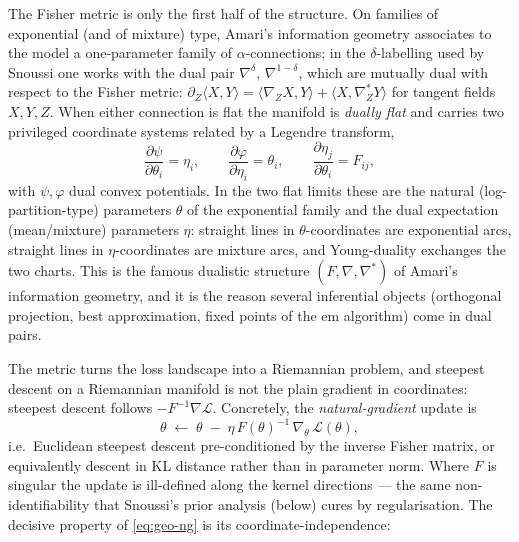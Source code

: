 The Fisher metric is only the first half of the structure. On families of
exponential (and of mixture) type, Amari's information geometry
\cite{amari1985} associates to
the model a one-parameter family of $\alpha$-connections; in the
$\delta$-labelling used by Snoussi one works with the dual pair
$\nabla^{\delta}$, $\nabla^{1-\delta}$, which are mutually dual with respect
to the Fisher metric:
$\partial_Z\langle X, Y\rangle = \langle \nabla_Z X, Y\rangle
+ \langle X, \nabla^{*}_Z Y\rangle$ for tangent fields $X, Y, Z$. When either
connection is flat the manifold is \emph{dually flat} and carries two
privileged coordinate systems related by a Legendre transform,
\begin{equation}
\frac{\partial \psi}{\partial \theta_i} = \eta_i,
\qquad
\frac{\partial \varphi}{\partial \eta_i} = \theta_i,
\qquad
\frac{\partial \eta_j}{\partial \theta_i} = F_{ij},
\label{eq:geo-legendre}
\end{equation}
with $\psi, \varphi$ dual convex potentials. In the two flat limits these are
the natural (log-partition-type) parameters $\theta$ of the exponential
family and the dual expectation (mean/mixture) parameters $\eta$: straight
lines in $\theta$-coordinates are exponential arcs, straight lines in
$\eta$-coordinates are mixture arcs, and Young-duality exchanges the two
charts. This is the famous dualistic structure $(F, \nabla, \nabla^{*})$ of
Amari's information geometry, and it is the reason several inferential
objects (orthogonal projection, best approximation, fixed points
of the em algorithm) come in dual pairs.

The metric turns the loss landscape into a Riemannian problem, and steepest
descent on a Riemannian manifold is not the plain gradient in coordinates:
steepest descent follows $-F^{-1}\nabla\mathcal{L}$. Concretely, the
\emph{natural-gradient} update is
\begin{equation}
\theta \;\leftarrow\; \theta \;-\; \eta\, F(\theta)^{-1}\, \nabla_\theta\,
\mathcal{L}(\theta),
\label{eq:geo-ng}
\end{equation}
i.e.\ Euclidean steepest descent pre-conditioned by the inverse Fisher
matrix, or equivalently descent in KL distance rather than in parameter norm.
Where $F$ is singular the update is ill-defined along the kernel
directions --- the same non-identifiability that Snoussi's prior analysis
(below) cures by regularisation. The decisive property of \eqref{eq:geo-ng} is its
coordinate-independence:


